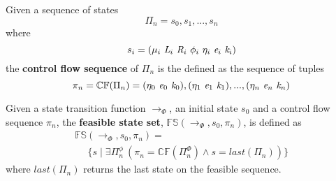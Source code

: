 \begin{definition}
Given a sequence of states $$\Pi_n = s_0,s_1,...,s_n$$ where $$s_i = ( \mu_i\ \cfgnt{L}_i\ \cfgnt{R}_i\ \phi_i\ \eta_i\ \cfgnt{e}_i\ \cfgnt{k}_i )$$ the \textbf{control flow sequence} of $\Pi_n$ is the defined as the sequence of tuples $$ \pi_n = \mathbb{CF}(\Pi_n) = (\eta_0\ \cfgnt{e}_0\ \cfgnt{k}_0),(\eta_1\ \cfgnt{e}_1\ \cfgnt{k}_1),...,(\eta_n\ \cfgnt{e}_n\ \cfgnt{k}_n)$$
\end{definition}

\begin{definition}
Given a state transition function $\rightarrow_{\Phi}$, an initial state $s_0$ and a control flow sequence $\pi_n$, the \textbf{feasible state set}, $\mathbb{FS}(\rightarrow_{\Phi},s_0,\pi_n)$, is defined as
 $$
\begin{array}{l}
\mathbb{FS}(\rightarrow_{\Phi},s_0,\pi_n) = \\
\ \ \ \ \ \ \{s \mid \exists \Pi_n^\phi\ (\pi_n = \mathbb{CF}(\Pi_n^\Phi) \wedge s = \mathit{last}(\Pi_n))\} 
\end{array}
$$
where $\mathit{last}(\Pi_n)$ returns the last state on the feasible sequence.
\end{definition}

%
%
%

